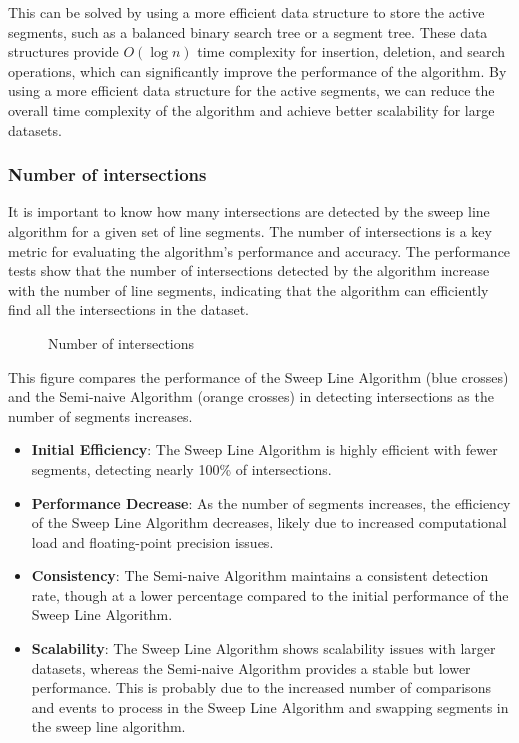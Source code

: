 \documentclass[10pt,a4paper,hidelinks]{article}
\begin{document}
This can be solved by using a more efficient data structure to store the active segments, such as a balanced binary search tree or a segment tree. These data structures provide $O(\log n)$ time complexity for insertion, deletion, and search operations, which can significantly improve the performance of the algorithm. By using a more efficient data structure for the active segments, we can reduce the overall time complexity of the algorithm and achieve better scalability for large datasets.

\subsubsection{Number of intersections}
It is important to know how many intersections are detected by the sweep line algorithm for a given set of line segments. The number of intersections is a key metric for evaluating the algorithm's performance and accuracy. The performance tests show that the number of intersections detected by the algorithm increase with the number of line segments, indicating that the algorithm can efficiently find all the intersections in the dataset.
\begin{figure}[h]
    \centering
    
    \caption{Number of intersections}
\end{figure}
This figure compares the performance of the Sweep Line Algorithm (blue crosses) and the Semi-naive Algorithm (orange crosses) in detecting intersections as the number of segments increases.

\begin{itemize}
    \item \textbf{Initial Efficiency}: The Sweep Line Algorithm is highly efficient with fewer segments, detecting nearly 100\% of intersections.
    \item \textbf{Performance Decrease}: As the number of segments increases, the efficiency of the Sweep Line Algorithm decreases, likely due to increased computational load and floating-point precision issues.
    \item \textbf{Consistency}: The Semi-naive Algorithm maintains a consistent detection rate, though at a lower percentage compared to the initial performance of the Sweep Line Algorithm.
    \item \textbf{Scalability}: The Sweep Line Algorithm shows scalability issues with larger datasets, whereas the Semi-naive Algorithm provides a stable but lower performance. This is probably due to the increased number of comparisons and events to process in the Sweep Line Algorithm and swapping segments in the sweep line algorithm.
\end{itemize}
\end{document}
